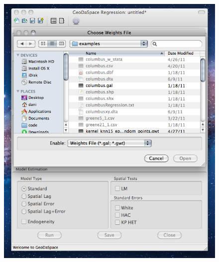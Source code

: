 \documentclass[nototal]{beamer}
\begin{document}
\begin{frame}
\begin{columns}
\begin{column}{0.5\linewidth}
\begin{figure}
  \includegraphics[width=1.00\linewidth]{figs/gs3-select.png}
  \end{figure}
  \end{column}
  \end{columns}
 \end{frame} 
\end{document}
